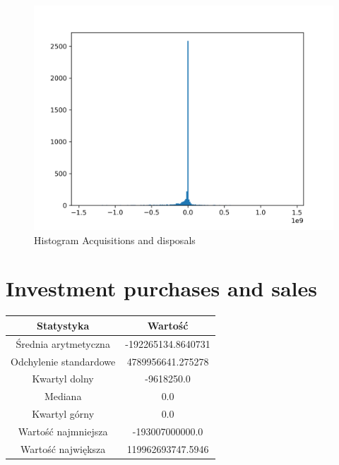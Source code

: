 \documentclass{article}
\begin{document}
\begin{figure}[h!]
    \includegraphics[width=\linewidth]{variables/Acquisitions and disposals.png}
    \caption{Histogram Acquisitions and disposals }
\end{figure}\section{ Investment purchases and sales }

\begin{center}
    \begin{tabular}{|c | c|} 
    \hline
    Statystyka & Wartość \\
    \hline\hline
    Średnia arytmetyczna & -192265134.8640731 \\ 
    \hline
    Odchylenie standardowe & 4789956641.275278 \\
    \hline
    Kwartyl dolny & -9618250.0 \\
    \hline
    Mediana & 0.0 \\
    \hline
    Kwartyl górny & 0.0 \\
    \hline
    Wartość najmniejsza & -193007000000.0 \\
    \hline
    Wartość największa & 119962693747.5946 \\
    \hline
   \end{tabular}
\end{center}
\end{document}
